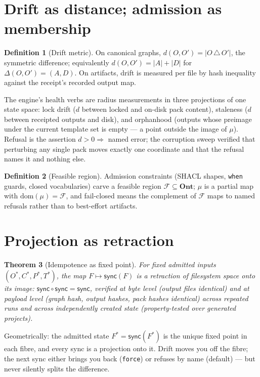 \documentclass[11pt,a4paper]{report}
\newtheorem{theorem}{Theorem}[chapter]
\theoremstyle{definition}
\newtheorem{definition}[theorem]{Definition}
\theoremstyle{remark}
\newcommand{\Ont}{\mathbf{Ont}}
\newcommand{\sync}{\mathsf{sync}}
\newcommand{\mymu}{\mu}
\newcommand{\del}{\Delta}
\begin{document}
\section{Drift as distance; admission as membership}

\begin{definition}[Drift metric]
On canonical graphs, $d(O,O') = |O \,\triangle\, O'|$, the symmetric
difference; equivalently $d(O,O') = |A| + |D|$ for
$\del(O,O') = (A,D)$. On artifacts, drift is measured per file by hash
inequality against the receipt's recorded output map.
\end{definition}

The engine's health verbs are radius measurements in three projections of
one state space: lock drift ($d$ between locked and on-disk pack content),
staleness ($d$ between receipted outputs and disk), and orphanhood
(outputs whose preimage under the current template set is empty ---
a point outside the image of $\mymu$). Refusal is the assertion
$d > 0 \Rightarrow$ named error; the corruption sweep verified that
perturbing any single pack moves exactly one coordinate and that the refusal
names it and nothing else.

\begin{definition}[Feasible region]
Admission constraints (SHACL shapes, \texttt{when} guards, closed
vocabularies) carve a feasible region
$\mathcal{F} \subseteq \Ont$; $\mymu$ is a partial map with
$\mathrm{dom}(\mymu) = \mathcal{F}$, and fail-closed means the complement of
$\mathcal{F}$ maps to named refusals rather than to best-effort artifacts.
\end{definition}

\section{Projection as retraction}

\begin{theorem}[Idempotence as fixed point]\label{thm:retract}
For fixed admitted inputs $(O^{*}, C^{*}, P^{*}, T^{*})$, the map
$F \mapsto \sync(F)$ is a retraction of filesystem space onto its image:
$\sync \circ \sync = \sync$, verified at byte level (output files identical)
and at payload level (graph hash, output hashes, pack hashes identical)
across repeated runs and across independently created state
(property-tested over generated projects).
\end{theorem}

Geometrically: the admitted state $F^{*} = \sync(F^{*})$ is the unique fixed
point in each fibre, and every sync is a projection onto it. Drift moves you
off the fibre; the next sync either brings you back (\texttt{force}) or
refuses by name (default) --- but never silently splits the difference.
\end{document}
